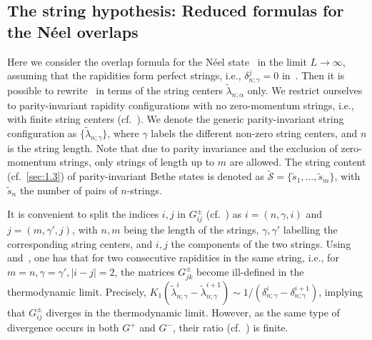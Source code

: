 \documentclass[11pt]{iopart}
\begin{document}
\subsection{The string hypothesis: Reduced formulas for the N\'eel overlaps}
\label{sec:2.2}

Here we consider the overlap formula for the N\'eel state~ in the 
limit $L\to\infty$, assuming that the rapidities form perfect strings, i.e., 
$\delta_{n;\gamma}^j=0$ in~. Then it is possible to 
rewrite~ in terms of the string centers $\tilde\lambda_{n;\alpha}$ 
only. We restrict ourselves to parity-invariant rapidity configurations with no 
zero-momentum strings, i.e., with finite string centers (cf.~). 
We denote the generic parity-invariant string configuration as $\{\tilde
\lambda_{n;\gamma}\}$, where $\gamma$ labels the different non-zero string 
centers, and $n$ is the string length. Note that due to parity invariance and 
the exclusion of zero-momentum strings, only strings of length up to $m$ are 
allowed. The string 
content (cf.~\ref{sec:1.3}) of parity-invariant Bethe states is denoted as 
$\widetilde{\mathcal S}=\{\tilde s_1,\dots,\tilde s_{m}\}$, with $\tilde s_n$ 
the number of pairs of $n$-strings. 

It is convenient to split the indices $i,j$ in $G^\pm_{ij}$ (cf.~) as 
$i=(n,\gamma,i)$ and $j=(m,\gamma',j)$, with $n,m$ being the length of the strings, 
$\gamma,\gamma'$ labelling the corresponding string centers, and $i,j$ the components 
of the two strings. Using~ and~, one has that for two consecutive 
rapidities in the same string, i.e., for $m=n,\gamma=\gamma',|i-j|=2$, the matrices 
$G^{\pm}_{jk}$ become ill-defined in the thermodynamic limit. Precisely, $K_{1}(\tilde
\lambda_{n;\gamma}^i-\tilde\lambda_{n;\gamma}^{i+1})\sim 1/(\delta_{n;\gamma}^i-
\delta_{n;\gamma}^{i+1})$, implying that $G_{ij}^\pm$ diverges in the thermodynamic 
limit. However, as the same type of divergence occurs in both $G^+$ and $G^-$, their 
ratio (cf.~) is finite. 
\end{document}
